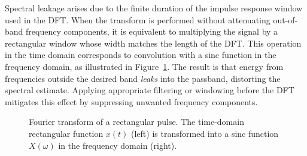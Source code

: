 Spectral leakage arises due to the finite duration of the impulse response window used in the DFT. When the transform is performed without attenuating out-of-band frequency components, it is equivalent to multiplying the signal by a rectangular window whose width matches the length of the DFT. This operation in the time domain corresponds to convolution with a sinc function in the frequency domain, as illustrated in Figure~\ref{fig:rectangular_fourier}. The result is that energy from frequencies outside the desired band \emph{leaks} into the passband, distorting the spectral estimate. Applying appropriate filtering or windowing before the DFT mitigates this effect by suppressing unwanted frequency components.
\begin{figure}[h!]
	\centering
	\caption[Fourier transform of a rectangular pulse]{Fourier transform of a rectangular pulse. The time-domain rectangular function $x(t)$ (left) is transformed into a sinc function $X(\omega)$ in the frequency domain (right).}
	\label{fig:rectangular_fourier}
\end{figure}
